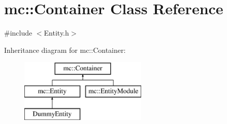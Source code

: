 \hypertarget{classmc_1_1_container}{}\section{mc\+:\+:Container Class Reference}
\label{classmc_1_1_container}


{\ttfamily \#include $<$Entity.\+h$>$}

Inheritance diagram for mc\+:\+:Container\+:\begin{figure}[H]
\begin{center}
\leavevmode
\includegraphics[height=3.000000cm]{classmc_1_1_container}
\end{center}
\end{figure}
